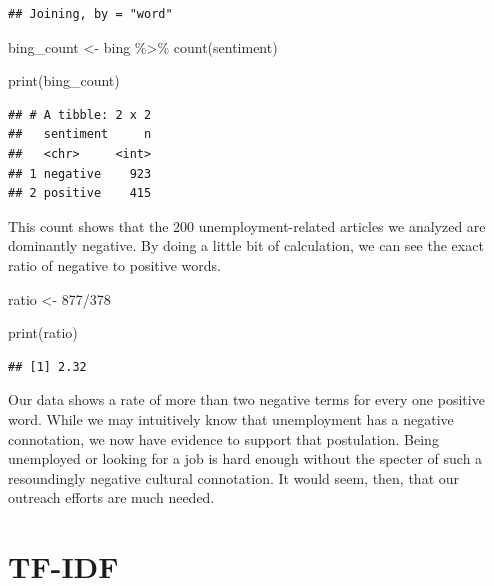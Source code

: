 \documentclass[
  krantz2]{krantz}
\makeatletter
\newenvironment{Shaded}{\begin{snugshade}}{\end{snugshade}}
\newcommand{\DecValTok}[1]{\textcolor[rgb]{0.06,0.06,0.06}{#1}}
\newcommand{\FunctionTok}[1]{\textcolor[rgb]{0,0,0}{#1}}
\newcommand{\NormalTok}[1]{#1}
\newcommand{\OtherTok}[1]{\textcolor[rgb]{0.37,0.37,0.37}{#1}}
\newcommand{\SpecialCharTok}[1]{\textcolor[rgb]{0,0,0}{#1}}
\newenvironment{kframe}{%
\medskip{}
\setlength{\fboxsep}{.8em}
 \def\at@end@of@kframe{}%
 \ifinner\ifhmode%
  \def\at@end@of@kframe{\end{minipage}}%
  \begin{minipage}{\columnwidth}%
 \fi\fi%
 \def\FrameCommand##1{\hskip\@totalleftmargin \hskip-\fboxsep
 \colorbox{shadecolor}{##1}\hskip-\fboxsep
     \hskip-\linewidth \hskip-\@totalleftmargin \hskip\columnwidth}%
 \MakeFramed {\advance\hsize-\width
   \@totalleftmargin\z@ \linewidth\hsize
   \@setminipage}}%
 {\par\unskip\endMakeFramed%
 \at@end@of@kframe}
\renewenvironment{Shaded}{\begin{kframe}}{\end{kframe}}
\makeatother
\begin{document}
\begin{verbatim}
## Joining, by = "word"
\end{verbatim}

\begin{Shaded}
\begin{Highlighting}[]
\NormalTok{bing\_count }\OtherTok{\textless{}{-}}\NormalTok{ bing }\SpecialCharTok{\%\textgreater{}\%}
  \FunctionTok{count}\NormalTok{(sentiment)}
\end{Highlighting}
\end{Shaded}

\begin{Shaded}
\begin{Highlighting}[]
\FunctionTok{print}\NormalTok{(bing\_count)}
\end{Highlighting}
\end{Shaded}

\begin{verbatim}
## # A tibble: 2 x 2
##   sentiment     n
##   <chr>     <int>
## 1 negative    923
## 2 positive    415
\end{verbatim}

This count shows that the 200 unemployment-related articles we analyzed are dominantly negative. By doing a little bit of calculation, we can see the exact ratio of negative to positive words.

\begin{Shaded}
\begin{Highlighting}[]
\NormalTok{ratio }\OtherTok{\textless{}{-}} \DecValTok{877}\SpecialCharTok{/}\DecValTok{378}

\FunctionTok{print}\NormalTok{(ratio)}
\end{Highlighting}
\end{Shaded}

\begin{verbatim}
## [1] 2.32
\end{verbatim}

Our data shows a rate of more than two negative terms for every one positive word. While we may intuitively know that unemployment has a negative connotation, we now have evidence to support that postulation. Being unemployed or looking for a job is hard enough without the specter of such a resoundingly negative cultural connotation. It would seem, then, that our outreach efforts are much needed.

\hypertarget{tf-idf}{%
\section{TF-IDF}\label{tf-idf}}
\end{document}
